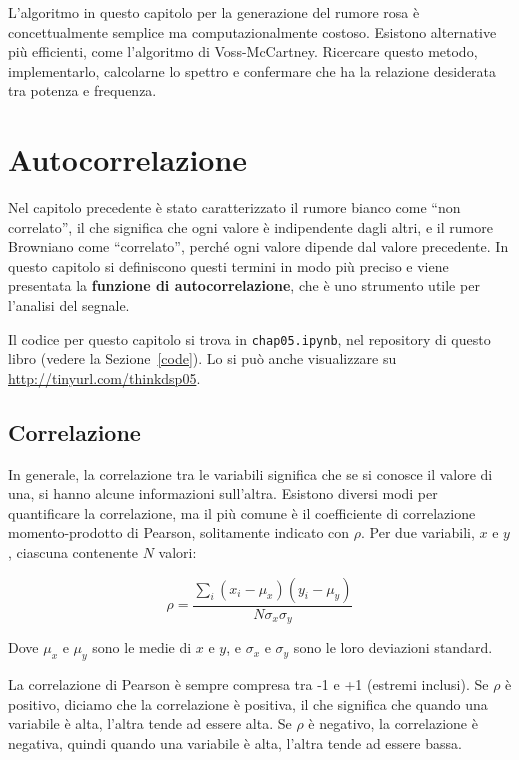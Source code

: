\documentclass[12pt]{book} \usepackage[width=5.5in,height=8.5in, hmarginratio=3:2,vmarginratio=1:1]{geometry}
\begin{document}
\begin{exercise} L'algoritmo in questo capitolo per la generazione del rumore rosa è concettualmente semplice ma computazionalmente costoso. Esistono alternative più efficienti, come l'algoritmo di Voss-McCartney. Ricercare questo metodo, implementarlo, calcolarne lo spettro e confermare che ha la relazione desiderata tra potenza e frequenza. \end{exercise} 

\chapter{Autocorrelazione} 

Nel capitolo precedente è stato caratterizzato il rumore bianco come ``non correlato'', il che significa che ogni valore è indipendente dagli altri, e il rumore Browniano come ``correlato'', perché ogni valore dipende dal valore precedente. In questo capitolo si definiscono questi termini in modo più preciso e viene presentata la {\bf funzione di autocorrelazione}, che è uno strumento utile per l'analisi del segnale.

Il codice per questo capitolo si trova in {\tt chap05.ipynb}, nel repository di questo libro (vedere la Sezione~\ref{code}). Lo si può anche visualizzare su \url{http://tinyurl.com/thinkdsp05}.

\section{Correlazione} 

In generale, la correlazione tra le variabili significa che se si conosce il valore di una, si hanno alcune informazioni sull'altra. Esistono diversi modi per quantificare la correlazione, ma il più comune è il coefficiente di correlazione momento-prodotto di Pearson, solitamente indicato con $\rho$. Per due variabili, $x$ e $y$, ciascuna contenente $N$ valori:

%
\[ \rho = \frac{ \sum_i (x_i - \mu_x) (y_i - \mu_y)}{N \sigma_x \sigma_y} \] 

%
Dove $\mu_x$ e $\mu_y$ sono le medie di $x$ e $y$, e $\sigma_x$ e $\sigma_y$ sono le loro deviazioni standard.

La correlazione di Pearson è sempre compresa tra -1 e +1 (estremi inclusi). Se $\rho$ è positivo, diciamo che la correlazione è positiva, il che significa che quando una variabile è alta, l'altra tende ad essere alta. Se $\rho$ è negativo, la correlazione è negativa, quindi quando una variabile è alta, l'altra tende ad essere bassa.
\end{document}
